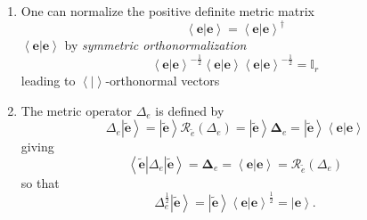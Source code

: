 \documentclass[aps,preprint]{revtex4}%
\begin{document}
\begin{enumerate}
\item One can normalize the positive definite metric matrix
\begin{equation}
\left\langle \left.  \mathbf{e}\right\vert \mathbf{e}\right\rangle
=\left\langle \left.  \mathbf{e}\right\vert \mathbf{e}\right\rangle ^{\dagger}%
\end{equation}
$\left\langle \left.  \mathbf{e}\right\vert \mathbf{e}\right\rangle $ by
\emph{symmetric orthonormalization}
\begin{equation}
\left\langle \left.  \mathbf{e}\right\vert \mathbf{e}\right\rangle ^{-\frac
{1}{2}}\left\langle \left.  \mathbf{e}\right\vert \mathbf{e}\right\rangle
\left\langle \left.  \mathbf{e}\right\vert \mathbf{e}\right\rangle ^{-\frac
{1}{2}}=\mathbb{I}_{r}%
\end{equation}
leading to $\left\langle \left.  {}\right\vert \right\rangle $-orthonormal vectors

\item The metric operator $\Delta_{e}$ is defined by
\begin{equation}
\Delta_{e}\left\vert \widetilde{\mathbf{e}}\right\rangle =\left\vert
\widetilde{\mathbf{e}}\right\rangle \mathcal{R}_{\widetilde{e}}\left(
\Delta_{e}\right)  =\left\vert \widetilde{\mathbf{e}}\right\rangle
\mathbf{\Delta}_{e}=\left\vert \widetilde{\mathbf{e}}\right\rangle
\left\langle \left.  \mathbf{e}\right\vert \mathbf{e}\right\rangle
\end{equation}
giving%
\begin{equation}
\left\langle \widetilde{\mathbf{e}}\right\vert \Delta_{e}\left\vert
\widetilde{\mathbf{e}}\right\rangle =\mathbf{\Delta}_{e}=\left\langle \left.
\mathbf{e}\right\vert \mathbf{e}\right\rangle =\mathcal{R}_{\widetilde{e}%
}\left(  \Delta_{e}\right)
\end{equation}
so that%
\begin{equation}
\Delta_{e}^{\frac{1}{2}}\left\vert \widetilde{\mathbf{e}}\right\rangle
=\left\vert \widetilde{\mathbf{e}}\right\rangle \left\langle \left.
\mathbf{e}\right\vert \mathbf{e}\right\rangle ^{\frac{1}{2}}=\left\vert
\mathbf{e}\right\rangle .
\end{equation}



\end{enumerate}
\end{document}

